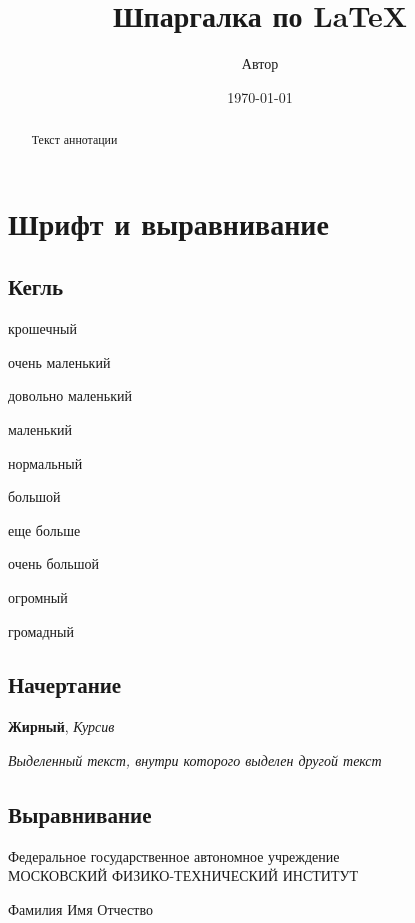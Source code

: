 

\author{Автор}
\title{Шпаргалка по \LaTeX}
\date{\today}

\immediate{}


\maketitle

\renewcommand{\abstractname}{Краткое содержание}
\begin{abstract}
    Текст аннотации
\end{abstract}

\section{Шрифт и выравнивание}
\subsection{Кегль}
\tiny крошечный

\scriptsize очень маленький

\footnotesize довольно маленький

\small маленький

\normalsize нормальный

\large большой

\Large еще больше

\LARGE очень большой

\begin{huge}
    огромный
\end{huge}

{\Huge громадный}
\normalsize


\subsection{Начертание}
\textbf{Жирный},
\textit{Курсив}

\emph{Выделенный текст, \emph{внутри которого выделен} другой текст}

\subsection{Выравнивание}
\thispagestyle{empty}
\begin{center}
    Федеральное государственное автономное учреждение\\
    МОСКОВСКИЙ ФИЗИКО-ТЕХНИЧЕСКИЙ ИНСТИТУТ
\end{center}
\vspace{3ex}
\begin{flushright}
    \noindent
    Фамилия Имя Отчество
\end{flushright}

